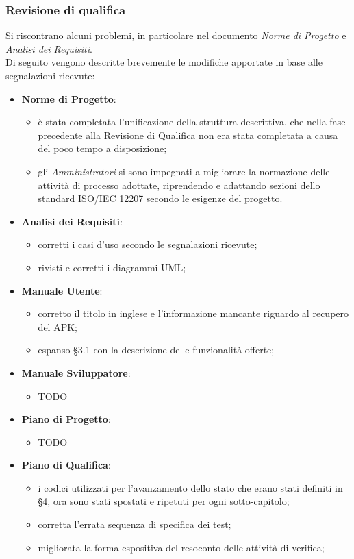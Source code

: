 	\subsubsection{Revisione di qualifica}
	Si riscontrano alcuni problemi, in particolare nel documento \textit{Norme di Progetto} e \textit{Analisi dei Requisiti}.\\
	Di seguito vengono descritte brevemente le modifiche apportate in base alle segnalazioni ricevute:
	\begin{itemize}
		\item \textbf{Norme di Progetto}: 
			\begin{itemize}
				\item è stata completata l'unificazione della struttura descrittiva, che nella fase precedente alla Revisione di Qualifica non era stata completata a causa del poco tempo a disposizione;
				\item gli \textit{Amministratori} si sono impegnati a migliorare la normazione delle attività di processo adottate, riprendendo e adattando sezioni dello standard ISO/IEC 12207 secondo le esigenze del progetto.  
			\end{itemize}
		\item \textbf{Analisi dei Requisiti}:
			\begin{itemize}
				\item corretti i casi d'uso secondo le segnalazioni ricevute;
				\item rivisti e corretti i diagrammi UML;
			\end{itemize}
		\item \textbf{Manuale Utente}:
			\begin{itemize}
				\item corretto il titolo in inglese e l'informazione mancante riguardo al recupero del 
				APK;
				\item espanso §3.1 con la descrizione delle funzionalità offerte;
			\end{itemize}
		\item \textbf{Manuale Sviluppatore}:
			\begin{itemize}
				\item TODO
			\end{itemize}
		\item \textbf{Piano di Progetto}:
			\begin{itemize}
				\item TODO
			\end{itemize}
		\item \textbf{Piano di Qualifica}:
			\begin{itemize}
				\item i codici utilizzati per l'avanzamento dello stato che erano stati definiti in §4, ora sono stati spostati e ripetuti per ogni sotto-capitolo;
				\item corretta l'errata sequenza di specifica dei test;
				\item migliorata la forma espositiva del resoconto delle attività di verifica;
			\end{itemize}
	\end{itemize}
	\newpage
